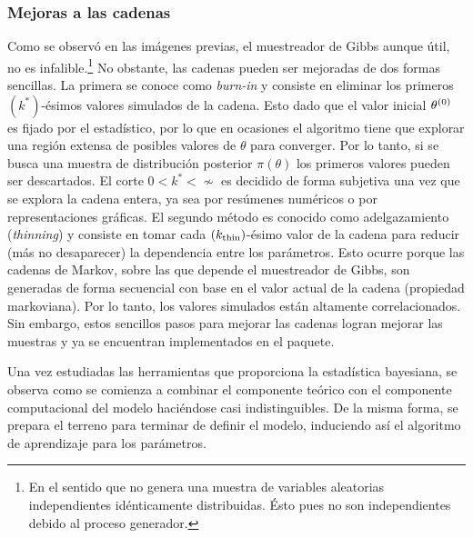 \documentclass[../Main/Main.tex]{subfiles}
\begin{document}
\subsubsection*{Mejoras a las cadenas}
Como se observó en las imágenes previas, el muestreador de Gibbs aunque útil, no es infalible.\footnote{En el sentido que no genera una muestra de variables aleatorias independientes idénticamente distribuidas. Ésto pues no son independientes debido al proceso generador.} No obstante, las cadenas pueden ser mejoradas de dos formas sencillas. La primera se conoce como \textit{burn-in} y consiste en eliminar los primeros $(k^*)$-ésimos valores simulados de la cadena. Esto dado que el valor inicial $\theta^{(0)}$ es fijado por el estadístico, por lo que en ocasiones el algoritmo tiene que explorar una región extensa de posibles valores de $\theta$ para converger. Por lo tanto, si se busca una muestra de distribución posterior $\pi(\theta)$ los primeros valores pueden ser descartados. El corte $0<k^*<\nsim$ es decidido de forma subjetiva una vez que se explora la cadena entera, ya sea por resúmenes numéricos o por representaciones gráficas. El segundo método es conocido como adelgazamiento (\textit{thinning}) y consiste en tomar cada $(k_{\text{thin}})$-ésimo valor de la cadena para reducir (más no desaparecer) la dependencia entre los parámetros. Esto ocurre porque las cadenas de Markov, sobre las que depende el muestreador de Gibbs, son generadas de forma secuencial con base en el valor actual de la cadena (propiedad markoviana). Por lo tanto, los valores simulados están altamente correlacionados. Sin embargo, estos sencillos pasos para mejorar las cadenas logran mejorar las muestras y ya se encuentran implementados en el paquete.

Una vez estudiadas las herramientas que proporciona la estadística bayesiana, se observa como se comienza a combinar el componente teórico con el componente computacional del modelo haciéndose casi indistinguibles. De la misma forma, se prepara el terreno para terminar de definir el modelo, induciendo así el algoritmo de aprendizaje para los parámetros.
\end{document}
